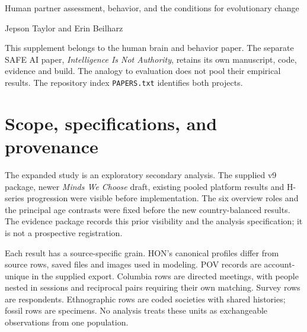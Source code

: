 \clearpage
\setcounter{section}{0}
\setcounter{figure}{0}
\setcounter{table}{0}
\setcounter{equation}{0}
\par
\vspace{5pt}
\par
\noindent Human partner assessment, behavior, and the conditions for evolutionary change\par
\noindent Jepson Taylor and Erin Beilharz\par
\vspace{5pt}
\noindent This supplement belongs to the human brain and behavior paper. The separate SAFE AI paper, \emph{Intelligence Is Not Authority}, retains its own manuscript, code, evidence and build. The analogy to evaluation does not pool their empirical results. The repository index \texttt{PAPERS.txt} identifies both projects.

\section{Scope, specifications, and provenance}

The expanded study is an exploratory secondary analysis. The supplied v9 package, newer \emph{Minds We Choose} draft, existing pooled platform results and H-series progression were visible before implementation. The six overview roles and the principal age contrasts were fixed before the new country-balanced results. The evidence package records this prior visibility and the analysis specification; it is not a prospective registration.

Each result has a source-specific grain. HON's canonical profiles differ from source rows, saved files and images used in modeling. POV records are account-unique in the supplied export. Columbia rows are directed meetings, with people nested in sessions and reciprocal pairs requiring their own matching. Survey rows are respondents. Ethnographic rows are coded societies with shared histories; fossil rows are specimens. No analysis treats these units as exchangeable observations from one population.

